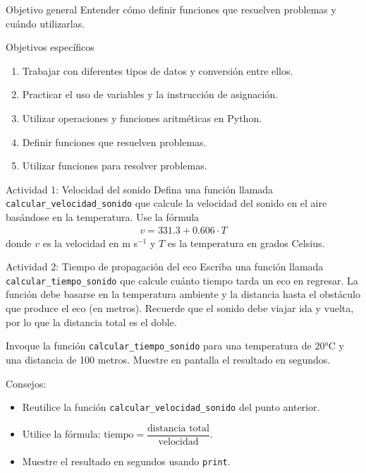 \documentclass{ip-lab}
\begin{document}
\maketitle

\begin{sectionbox}{Objetivo general}
Entender cómo definir funciones que resuelven problemas y cuándo utilizarlas.
\end{sectionbox}

\begin{sectionbox}{Objetivos específicos}
\begin{enumerate}
    \item Trabajar con diferentes tipos de datos y conversión entre ellos.
    \item Practicar el uso de variables y la instrucción de asignación.
    \item Utilizar operaciones y funciones aritméticas en Python.
    \item Definir funciones que resuelven problemas.
    \item Utilizar funciones para resolver problemas.
\end{enumerate}
\end{sectionbox}

\begin{sectionbox}{Actividad 1: Velocidad del sonido}
Defina una función llamada \texttt{calcular\_velocidad\_sonido} que calcule la velocidad del sonido en el aire basándose en la temperatura. Use la fórmula
\begin{gather*}
    v = 331.3 + 0.606 \cdot T
\end{gather*}
donde $v$ es la velocidad en m s$^{-1}$ y $T$ es la temperatura en grados Celsius.
\end{sectionbox}

\begin{sectionbox}{Actividad 2: Tiempo de propagación del eco}
Escriba una función llamada \texttt{calcular\_tiempo\_sonido} que calcule cuánto tiempo tarda un eco en regresar. La función debe basarse en la temperatura ambiente y la distancia hasta el obstáculo que produce el eco (en metros). Recuerde que el sonido debe viajar ida y vuelta, por lo que la distancia total es el doble. 

Invoque la función \texttt{calcular\_tiempo\_sonido} para una temperatura de 20°C y una distancia de 100 metros. Muestre en pantalla el resultado en segundos.

\pagebreak

Consejos:
\begin{itemize}
    \item Reutilice la función \texttt{calcular\_velocidad\_sonido} del punto anterior.
    \item Utilice la fórmula: $\text{tiempo} = \dfrac{\text{distancia total}}{\text{velocidad}}$.
    \item Muestre el resultado en segundos usando \texttt{print}.
\end{itemize}
\end{sectionbox}
\end{document}
